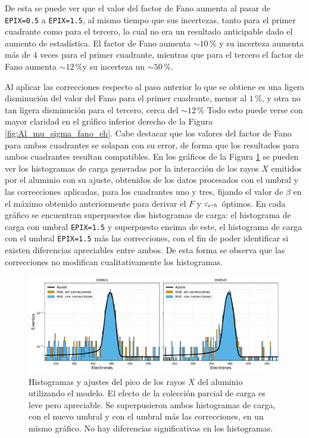 De esta se puede ver que el valor del factor de Fano aumenta al pasar de \verb|EPIX=0.5| a \verb|EPIX=1.5|, al mismo tiempo que sus incertezas, tanto para el primer cuadrante como para el tercero, lo cual no era un resultado anticipable dado el aumento de estadística. El factor de Fano aumenta $\sim 10\,\%$ y su incerteza aumenta más de $4$ veces para el primer cuadrante, mientras que para el tercero el factor de Fano aumenta $\sim 12\,\%$y su incerteza un $\sim 50\,\%$.

Al aplicar las correcciones respecto al paso anterior lo que se obtiene es una ligera disminución del valor del Fano para el primer cuadrante, menor al $1\,\%$, y otra no tan ligera disminución para el tercero, cerca del $\sim 12\,\%$%
Todo esto puede verse con mayor claridad en el gráfico inferior derecho de la Figura \ref{fig:Al_mu_sigma_fano_eh}. Cabe destacar que los valores del factor de Fano para ambos cuadrantes se solapan con su error, de forma que los resultados para ambos cuadrantes resultan compatibles. En los gráficos de la Figura \ref{fig:Al_OHDU1y3_EPIX15_Corr} se pueden ver los histogramas de carga generadas por la interacción de los rayos $X$ emitidos por el aluminio con su ajuste, obtenidos de los datos procesados con el umbral y las correcciones aplicadas, para los cuadrantes uno y tres, fijando el valor de $\beta$ en el máximo obtenido anteriormente para derivar el $F$ y $\varepsilon_{e\mbox{-}h}$ óptimos. En cada gráfico se encuentran superpuestos dos histogramas de carga: el histograma de carga con umbral \verb|EPIX=1.5| y superpuesto encima de este, el histograma de carga con el umbral \verb|EPIX=1.5| más las correcciones, con el fin de poder identificar si existen diferencias apreciables entre ambos. De esta forma se observa que las correcciones no modifican cualitativamente los histogramas.
\begin{figure}[h]
    \centering
        \includegraphics[scale=0.5]{Figs/Al_hists_ohdu1y3_dobles.pdf}
    \caption{Histogramas y ajustes del pico de los rayos $X$ del aluminio utilizando el modelo. El efecto de la colección parcial de carga es leve pero apreciable. Se superpusieron ambos histogramas de carga, con el nuevo umbral y con el umbral más las correcciones, en un mismo gráfico. No hay diferencias significativas en los histogramas.}
    \label{fig:Al_OHDU1y3_EPIX15_Corr}
\end{figure}
